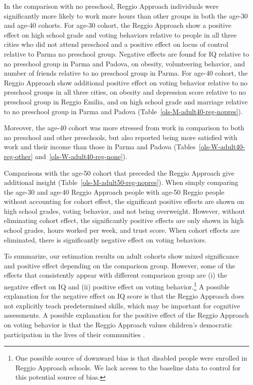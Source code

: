 In the comparison with no preschool, Reggio Approach individuals were significantly more likely to work more hours than other groups in both the age-30 and age-40 cohorts. For age-30 cohort, the Reggio Approach show a positive effect on high school grade and voting behaviors relative to people in all three cities who did not attend preschool and a positive effect on locus of control relative to Parma no preschool group. Negative effects are found for IQ relative to no preschool group in Parma and Padova, on obesity, volunteering behavior, and number of friends relative to no preschool group in Parma. For age-40 cohort, the Reggio Approach show additional positive effect on voting behavior relative to no preschool groups in all three cities, on obesity and depression score relative to no preschool group in Reggio Emilia, and on high school grade and marriage relative to no preschool group in Parma and Padova (Table~\ref{ols-M-adult40-reg-nopres}).

Moreover, the age-40 cohort was more stressed from work in comparison to both no preschool and other preschools, but also reported being more satisfied with work and their income than those in Parma and Padova (Tables~\ref{ols-W-adult40-reg-other} and~\ref{ols-W-adult40-reg-none}).

Comparisons with the age-50 cohort that preceded the Reggio Approach give additional insight (Table~\ref{ols-M-adult50-reg-nopres}). When simply comparing the age-30 and age-40 Reggio Approach people with age-50 Reggio people without accounting for cohort effect, the significant positive effects are shown on high school grades, voting behavior, and not being overweight. However, without eliminating cohort effect, the significantly positive effects are only shown in high school grades, hours worked per week, and trust score. When cohort effects are eliminated, there is significantly negative effect on voting behaviors.

To summarize, our estimation results on adult cohorts show mixed significance and positive effect depending on the comparison group. However, some of the effects that consistently appear with different comparison group are (i) the negative effect on IQ and (ii) positive effect on voting behavior.\footnote{One possible source of downward bias is that disabled people were enrolled in Reggio Approach schools. We lack access to the baseline data to control for this potential source of bias.} A possible explanation for the negative effect on IQ score is that the Reggio Approach does not explicitly teach predetermined skills, which may be important for cognitive assessments\citep{Cagliari-etal-eds_2016_BOOK_Loris-Malaguzzi}. A possible explanation for the positive effect of the Reggio Approach on voting behavior is that the Reggio Approach values children's democratic participation in the lives of their communities \citep{Lazzari_2012_Euro-J-Edu}.


